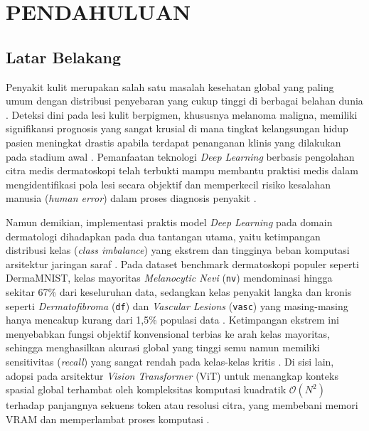 \newpage
\chapter{PENDAHULUAN} \label{Bab I}

\section{Latar Belakang} \label{I.Latar Belakang}
Penyakit kulit merupakan salah satu masalah kesehatan global yang paling umum dengan distribusi penyebaran yang cukup tinggi di berbagai belahan dunia \cite{esteva2017dermatologist}. Deteksi dini pada lesi kulit berpigmen, khususnya melanoma maligna, memiliki signifikansi prognosis yang sangat krusial di mana tingkat kelangsungan hidup pasien meningkat drastis apabila terdapat penanganan klinis yang dilakukan pada stadium awal \cite{tschandl2018ham10000}. Pemanfaatan teknologi \textit{Deep Learning} berbasis pengolahan citra medis dermatoskopi telah terbukti mampu membantu praktisi medis dalam mengidentifikasi pola lesi secara objektif dan memperkecil risiko kesalahan manusia (\textit{human error}) dalam proses diagnosis penyakit \cite{litjens2017survey}.\par

Namun demikian, implementasi praktis model \textit{Deep Learning} pada domain dermatologi dihadapkan pada dua tantangan utama, yaitu ketimpangan distribusi kelas (\textit{class imbalance}) yang ekstrem dan tingginya beban komputasi arsitektur jaringan saraf \cite{salmi2024imbalanced}. Pada dataset benchmark dermatoskopi populer seperti DermaMNIST, kelas mayoritas \textit{Melanocytic Nevi} (\texttt{nv}) mendominasi hingga sekitar 67\% dari keseluruhan data, sedangkan kelas penyakit langka dan kronis seperti \textit{Dermatofibroma} (\texttt{df}) dan \textit{Vascular Lesions} (\texttt{vasc}) yang masing-masing hanya mencakup kurang dari 1,5\% populasi data \cite{abhishek2025investigating}. Ketimpangan ekstrem ini menyebabkan fungsi objektif konvensional terbias ke arah kelas mayoritas, sehingga menghasilkan akurasi global yang tinggi semu namun memiliki sensitivitas (\textit{recall}) yang sangat rendah pada kelas-kelas kritis \cite{kadric2025improving, hariz2026analisis}. Di sisi lain, adopsi pada arsitektur \textit{Vision Transformer} (ViT) \cite{dosovitskiy2021image} untuk menangkap konteks spasial global terhambat oleh kompleksitas komputasi kuadratik $\mathcal{O}(N^2)$ terhadap panjangnya sekuens token atau resolusi citra, yang membebani memori VRAM dan memperlambat proses komputasi \cite{amangeldi2025cnn}.\par

